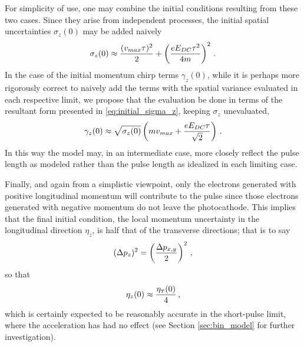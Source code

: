 For simplicity of use, one may combine the initial conditions resulting from these two cases.
Since they arise from independent processes, the initial spatial uncertainties $\sigma_{ z } ( 0 )$ may be added naively 
\begin{equation} \label{eq:initial_sigma_z}
  \sigma_{ z } ( 0 ) \approx \frac{ ( v_{max} \tau )^{ 2 } }{ 2 } + \left ( \frac{ e E_{ DC } \tau^{ 2 } }{ 4 m } \right )^{ 2 } \, \text{.}
\end{equation}
In the case of the initial momentum chirp terms $\gamma_{ z } ( 0 )$, while it is perhaps more rigorously correct to naively add  the terms with the spatial variance evaluated in each respective limit, we propose that the evaluation be done in terms of the resultant form presented in \ref{eq:initial_sigma_z}, keeping $\sigma_{z}$ unevaluated, 
\begin{equation}
  \gamma_{ z } ( 0 ) \approx \sqrt{ \sigma_{ z } ( 0 ) } \left ( m v_{max} + \frac{ e E_{DC} \tau }{ \sqrt{ 2 } } \right ) \, \text{.}
\end{equation}
In this way the model may, in an intermediate case, more closely reflect the pulse length as modeled rather than the pulse length as idealized in each limiting case.

Finally, and again from a simplistic viewpoint, only the electrons generated with positive longitudinal momentum will contribute to the pulse since those electrons generated with negative momentum do not leave the photocathode.
This implies that the final initial condition, the local momentum uncertainty in the longitudinal direction $\eta_z$, is half that of the transverse directions; that is to say
\begin{equation}
  ( \Delta p_{ z } )^{2} = \left ( \frac{\Delta p_{ x , y }}{ 2 } \right )^{2} \, \text{,}
\end{equation}
so that
\begin{equation}
  \eta_{ z } ( 0 ) \approx \frac{ \eta_{ {\scriptscriptstyle T} } ( 0 )}{ 4 } \, \text{,}
\end{equation}
which is certainly expected to be reasonably accurate in the short-pulse limit, where the acceleration has had no effect (see Section \ref{sec:bin_model} for further investigation).

